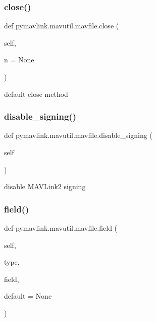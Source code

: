 \subsubsection{\texorpdfstring{close()}{close()}}
{\footnotesize\ttfamily def pymavlink.\+mavutil.\+mavfile.\+close (\begin{DoxyParamCaption}\item[{}]{self,  }\item[{}]{n = {\ttfamily None} }\end{DoxyParamCaption})}

\begin{DoxyVerb}default close method\end{DoxyVerb}
 \mbox{\label{classpymavlink_1_1mavutil_1_1mavfile_abd262cadb041fdae939dbfb49219f4be}} 
\subsubsection{\texorpdfstring{disable\+\_\+signing()}{disable\_signing()}}
{\footnotesize\ttfamily def pymavlink.\+mavutil.\+mavfile.\+disable\+\_\+signing (\begin{DoxyParamCaption}\item[{}]{self }\end{DoxyParamCaption})}

\begin{DoxyVerb}disable MAVLink2 signing\end{DoxyVerb}
 \mbox{\label{classpymavlink_1_1mavutil_1_1mavfile_ae2070e90f4df43fc8b44ae29a9a996ed}} 
\subsubsection{\texorpdfstring{field()}{field()}}
{\footnotesize\ttfamily def pymavlink.\+mavutil.\+mavfile.\+field (\begin{DoxyParamCaption}\item[{}]{self,  }\item[{}]{type,  }\item[{}]{field,  }\item[{}]{default = {\ttfamily None} }\end{DoxyParamCaption})}

